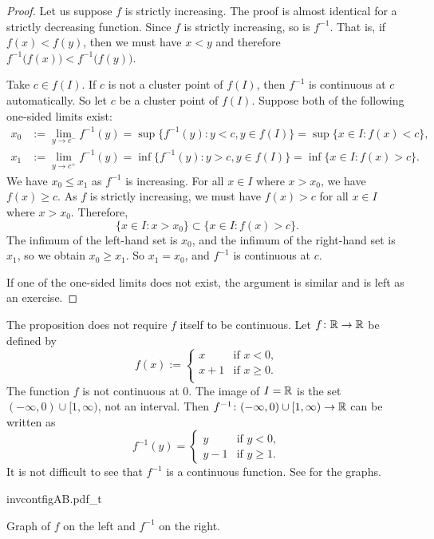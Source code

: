 \begin{proof}
Let us suppose $f$ is strictly increasing.  The proof is almost
identical for a strictly decreasing function.
Since $f$ is strictly increasing, so is $f^{-1}$.  That is, if $f(x) <
f(y)$, then we must have $x < y$ and therefore
$f^{-1}\bigl(f(x)\bigr) < f^{-1}\bigl(f(y)\bigr)$.

Take $c \in f(I)$.
If $c$ is not a cluster point of $f(I)$, then $f^{-1}$ is continuous at $c$
automatically.  So let $c$ be a cluster point of $f(I)$.
Suppose both of the following one-sided limits exist:
\begin{align*}
x_0 & := \lim_{y \to c^-} f^{-1}(y) =
\sup \bigl\{ f^{-1}(y) : y < c, y \in f(I) \bigr\}
=
\sup \bigl\{ x \in I : f(x) < c \bigr\} , \\
x_1 & := \lim_{y \to c^+} f^{-1}(y) =
\inf \bigl\{ f^{-1}(y) : y > c, y \in f(I) \bigr\}
=
\inf \bigl\{ x \in I : f(x) > c \bigr\} .
\end{align*}
We have $x_0 \leq x_1$ as $f^{-1}$ is increasing.
For all $x \in I$ where $x > x_0$, we have $f(x) \geq c$.  As $f$ is strictly increasing,
we must have $f(x) > c$ for all $x \in I$ where $x > x_0$.  Therefore,
\begin{equation*}
\{ x \in I : x > x_0 \} \subset \bigl\{ x \in I : f(x) > c \bigr\}.
\end{equation*}
The infimum of the left-hand set is $x_0$, and the infimum of the right-hand
set is $x_1$, so we obtain $x_0 \geq x_1$.
So $x_1 = x_0$, and $f^{-1}$ is continuous at $c$.

If one of the one-sided limits does not exist, the argument is similar
and is left as an exercise.
\end{proof}

\begin{example}
The proposition does not require $f$ itself to be continuous.  Let
$f \colon {\mathbb{R}} \to {\mathbb{R}}$ be defined by
\begin{equation*}
f(x) :=
\begin{cases}
x & \text{if } x < 0, \\
x+1 & \text{if } x \geq 0. \\
\end{cases}
\end{equation*}
The function $f$ is not continuous at $0$.
The image of $I = {\mathbb{R}}$ is the set 
$(-\infty,0)\cup [1,\infty)$, not an interval.
Then $f^{-1} \colon (-\infty,0)\cup [1,\infty)
\to {\mathbb{R}}$ can be written as
\begin{equation*}
f^{-1}(y) =
\begin{cases}
y & \text{if } y < 0, \\
y-1 & \text{if } y \geq 1. 
\end{cases}
\end{equation*}
It is not difficult to see that $f^{-1}$ is a continuous function.  See
 for the graphs.
\begin{myfigureht}
{invcontfigAB.pdf_t}
\caption{Graph of $f$ on the left and $f^{-1}$ on the right.\label{invcontfig}}
\end{myfigureht}
\end{example}

